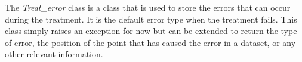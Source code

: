 The \textit{Treat\_error} class is a class that is used to store the errors that can occur during the treatment. It is the default error type when the treatment fails. This class simply raises an exception for now but can be extended to return the type of error, the position of the point that has caused the error in a dataset, or any other relevant information.
